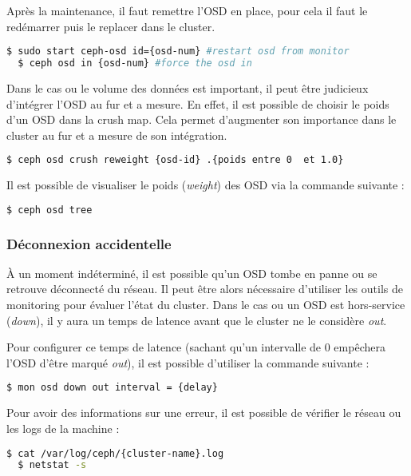 Après la maintenance, il faut remettre l'OSD en place, pour cela il faut le redémarrer puis le replacer dans le cluster.
\vspace{3mm}
\begin{lstlisting}[language=bash]
  $ sudo start ceph-osd id={osd-num} #restart osd from monitor
  $ ceph osd in {osd-num} #force the osd in
\end{lstlisting}

Dans le cas ou le volume des données est important, il peut être judicieux d'intégrer l'OSD au fur et a mesure. En effet, il est possible de choisir le poids d'un OSD dans la crush map. Cela permet d'augmenter son importance dans le cluster au fur et a mesure de son intégration.
\vspace{3mm}
\begin{lstlisting}[language=bash]
  $ ceph osd crush reweight {osd-id} .{poids entre 0  et 1.0}
\end{lstlisting}
Il est possible de visualiser le poids (\textit{weight}) des OSD via la commande suivante :
\vspace{3mm}
\begin{lstlisting}[language=bash]
  $ ceph osd tree
\end{lstlisting}

\subsubsection{Déconnexion accidentelle}

À un moment indéterminé, il est possible qu'un OSD tombe en panne ou se retrouve déconnecté du réseau. Il peut être alors nécessaire d'utiliser les outils de monitoring pour évaluer l'état du cluster. Dans le cas ou un OSD est hors-service (\ie \textit{down}), il y aura un temps de latence avant que le cluster ne le considère \textit{out}.

Pour configurer ce temps de latence (sachant qu'un intervalle de 0 empêchera l'OSD d'être marqué \textit{out}), il est possible d'utiliser la commande suivante :
\vspace{3mm}
\lstset{emph=mon}
\begin{lstlisting}[language=bash]
  $ mon osd down out interval = {delay}
\end{lstlisting}

Pour avoir des informations sur une erreur, il est possible de vérifier le réseau ou les logs de la machine :
\vspace{3mm}
\begin{lstlisting}[language=bash]
  $ cat /var/log/ceph/{cluster-name}.log
  $ netstat -s
\end{lstlisting}

